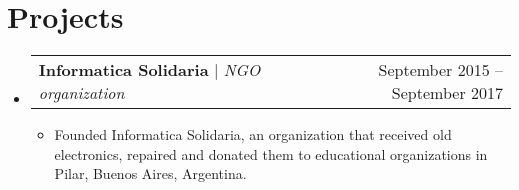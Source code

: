 \documentclass[letterpaper,11pt]{article}
\makeatletter
\newcommand{\resumeItem}[1]{
  \item\small{
    {#1 \vspace{-2pt}}
  }
}
\newcommand{\resumeProjectHeading}[2]{
    \item
    \begin{tabular*}{0.97\textwidth}{l@{\extracolsep{\fill}}r}
      \small#1 & #2 \\
    \end{tabular*}\vspace{-7pt}
}
\newcommand{\resumeSubHeadingListStart}{\begin{itemize}[leftmargin=0.15in, label={}]}
\newcommand{\resumeSubHeadingListEnd}{\end{itemize}}
\newcommand{\resumeItemListStart}{\begin{itemize}}
\newcommand{\resumeItemListEnd}{\end{itemize}\vspace{-5pt}}
\makeatother
\begin{document}
\section{Projects}
    \resumeSubHeadingListStart
      \resumeProjectHeading
          {\textbf{Informatica Solidaria} $|$ \emph{NGO organization}}{September 2015 -- September 2017}
          \resumeItemListStart
            \resumeItem{Founded Informatica Solidaria, an organization that received old electronics, repaired and donated them to educational organizations in Pilar, Buenos Aires, Argentina.}
          \resumeItemListEnd
    \resumeSubHeadingListEnd

\end{document}
